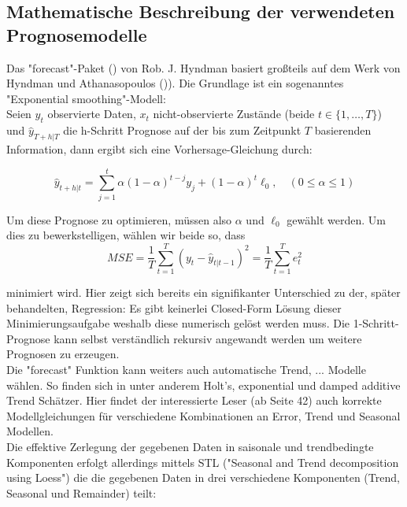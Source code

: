 \documentclass[a4paper,11pt]{article}
\begin{document}
\subsection{Mathematische Beschreibung der verwendeten Prognosemodelle}

Das "forecast"-Paket (\cite{forecast}) von Rob. J. Hyndman basiert großteils auf dem Werk von Hyndman und Athanasopoulos ()\cite{hyndman2018forecasting}). Die Grundlage ist ein sogenanntes "Exponential smoothing"-Modell:\\

Seien $y_t$ observierte Daten, $x_t$ nicht-observierte Zustände (beide $t \in \{1,\dots,T\}$) und $\hat{y}_{T+h|T}$ die h-Schritt Prognose auf der bis zum Zeitpunkt $T$ basierenden Information, dann ergibt sich eine Vorhersage-Gleichung durch:

\begin{equation} 
	\hat{y}_{t+h|t}=\sum_{j=1}^{t} \alpha(1-\alpha)^{t-j} y_{j}+(1-\alpha)^{t} \ell_{0}, \quad(0 \leq \alpha \leq 1)
\end{equation}

Um diese Prognose zu optimieren, müssen also $\alpha$ und $\ell_0$ gewählt werden. Um dies zu bewerkstelligen, wählen wir beide so, dass 
\begin{equation} 
	MSE=\frac{1}{T} \sum_{t=1}^{T}\left(y_{t}-\hat{y}_{t|t-1}\right)^{2}=\frac{1}{T} \sum_{t=1}^{T} e_{t}^{2}
\end{equation}

minimiert wird. Hier zeigt sich bereits ein signifikanter Unterschied zu der, später behandelten, Regression: Es gibt keinerlei Closed-Form Lösung dieser Minimierungsaufgabe weshalb diese numerisch gelöst werden muss. Die 1-Schritt-Prognose kann selbst verständlich rekursiv angewandt werden um weitere Prognosen zu erzeugen.\\

Die "forecast" Funktion kann weiters auch automatische Trend, ... Modelle wählen. So finden sich in \cite{hyndman2018forecasting} unter anderem Holt's, exponential und damped additive Trend Schätzer. Hier findet der interessierte Leser (ab Seite 42) auch korrekte Modellgleichungen für verschiedene Kombinationen an Error, Trend und Seasonal Modellen. \\

Die effektive Zerlegung der gegebenen Daten in saisonale und trendbedingte Komponenten erfolgt allerdings mittels STL  ("Seasonal and Trend decomposition using Loess") \cite{cleveland1990stl} die die gegebenen Daten in drei verschiedene Komponenten (Trend, Seasonal und Remainder) teilt:
\end{document}
